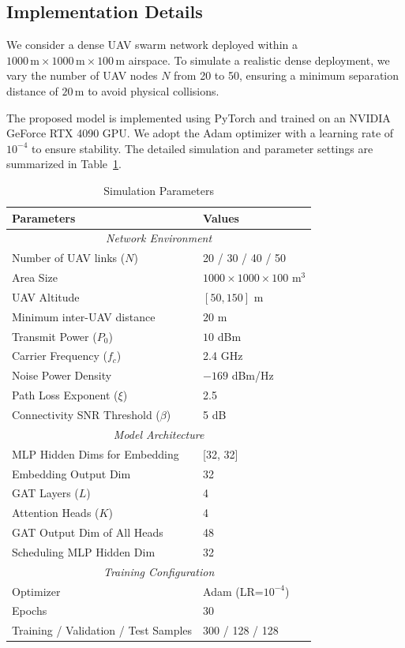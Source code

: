 \documentclass[journal]{IEEEtran}
\begin{document}
	\subsection{Implementation Details}
	We consider a dense UAV swarm network deployed within a $1000\,\text{m} \times 1000\,\text{m}\times 100\,\text{m}$ airspace. To simulate a realistic dense deployment, we vary the number of UAV nodes $N$ from 20 to 50, ensuring a minimum separation distance of $20\,\text{m}$ to avoid physical collisions.
	
	The proposed model is implemented using PyTorch and trained on an NVIDIA GeForce RTX 4090 GPU. We adopt the Adam optimizer with a learning rate of $10^{-4}$ to ensure stability. The detailed simulation and parameter settings are summarized in Table~\ref{tab:sim_params}.
	
	\begin{table}[htbp]
		\caption{Simulation Parameters}
		\label{tab:sim_params}
		\centering
		\begin{tabular}{ll}
			\toprule
			\textbf{Parameters} & \textbf{Values} \\
			\midrule
			\multicolumn{2}{c}{\textit{Network Environment}} \\
			\midrule
			Number of UAV links ($N$) & 20 / 30 / 40 / 50 \\
			Area Size & $1000 \times 1000\times 100$ m$^3$ \\
			UAV Altitude & $[50, 150]$ m \\
			Minimum inter-UAV distance & $20$ m \\
			Transmit Power ($P_0$) & $10$ dBm \\
			Carrier Frequency ($f_c$) & 2.4 GHz \\
			Noise Power Density & $-169$ dBm/Hz \\
			Path Loss Exponent ($\xi$) & 2.5 \\
			Connectivity SNR Threshold ($\beta$) & 5 dB \\
			\midrule
			\multicolumn{2}{c}{\textit{Model Architecture}} \\
			\midrule
			MLP Hidden Dims for Embedding & [32, 32]\\
			Embedding Output Dim & 32 \\
			GAT Layers ($L$) & 4 \\
			Attention Heads ($K$) & 4 \\
			GAT Output Dim of All Heads & 48\\
			Scheduling MLP Hidden Dim & 32 \\
			\midrule
			\multicolumn{2}{c}{\textit{Training Configuration}} \\
			\midrule
			Optimizer & Adam (LR=$10^{-4}$) \\
			Epochs & 30 \\
			Training / Validation / Test Samples & 300 / 128 / 128 \\
			\bottomrule
		\end{tabular}
	\end{table}
	
\end{document}
